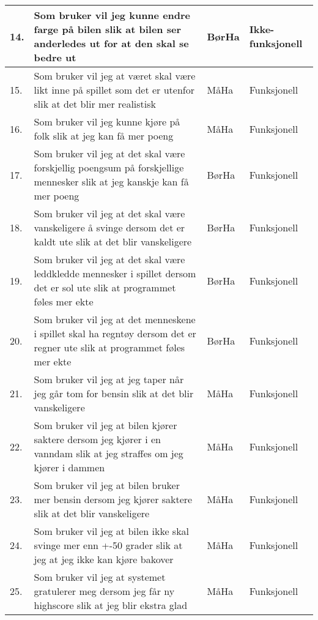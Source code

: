 \documentclass[norsk,a4paper]{article}
\begin{document}
\begin{center}
\begin{tabular}{ | m{0.4cm} | m{6.1cm} | m{2cm} | m{3cm} | }
\end{tabular}

\begin{tabular}{ | m{0.4cm} | m{6.5cm} | m{2cm} | m{3cm} | }
\hline
14. & Som bruker vil jeg kunne endre farge på bilen slik at bilen ser anderledes
ut for at den skal se bedre ut & BørHa & Ikke-funksjonell 
\\ \hline
15. & Som bruker vil jeg at været skal være likt inne på spillet som det er
utenfor slik at det blir mer realistisk & MåHa & Funksjonell 
\\ \hline
16. & Som bruker vil jeg kunne kjøre på folk slik at jeg kan få mer poeng 
& MåHa & Funksjonell 
\\ \hline
17. & Som bruker vil jeg at det skal være forskjellig poengsum på forskjellige
mennesker slik at jeg kanskje kan få mer poeng & BørHa & Funksjonell 
\\ \hline
18. & Som bruker vil jeg at det skal være vanskeligere å svinge dersom det er
kaldt ute slik at det blir vanskeligere & BørHa & Funksjonell 
\\ \hline
19. & Som bruker vil jeg at det skal være leddkledde mennesker i spillet dersom
det er sol ute slik at programmet føles mer ekte & BørHa & Funksjonell
\\ \hline
20. & Som bruker vil jeg at det menneskene i spillet skal ha regntøy dersom
det er regner ute slik at programmet føles mer ekte & BørHa & Funksjonell
\\ \hline
21. & Som bruker vil jeg at jeg taper når jeg går tom for bensin slik at det
blir vanskeligere & MåHa & Funksjonell
\\ \hline
22. & Som bruker vil jeg at bilen kjører saktere dersom jeg kjører i en vanndam
slik at jeg straffes om jeg kjører i dammen & MåHa & Funksjonell
\\ \hline
23. & Som bruker vil jeg at bilen bruker mer bensin dersom jeg kjører saktere
slik at det blir vanskeligere & MåHa & Funksjonell
\\ \hline
24. & Som bruker vil jeg at bilen ikke skal svinge mer enn +-50 grader slik at
jeg at jeg ikke kan kjøre bakover & MåHa & Funksjonell 
\\ \hline
25. & Som bruker vil jeg at systemet gratulerer meg dersom jeg får ny highscore
slik at jeg blir ekstra glad & MåHa & Funksjonell 
\\ \hline
\end{tabular}
\end{center}
\end{document}
